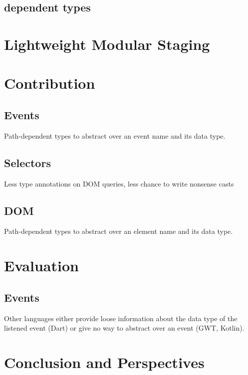 \documentclass[runningheads,a4paper]{llncs}
\begin{document}
\subsection{dependent types}

\section{Lightweight Modular Staging}

\section{Contribution}

\subsection{Events}

Path-dependent types to abstract over an event name and its data type.

\subsection{Selectors}

Less type annotations on DOM queries, less chance to write nonsense casts

\subsection{DOM}

Path-dependent types to abstract over an element name and its data type.

\section{Evaluation}

\subsection{Events}

Other languages either provide loose information about the data type of the listened event (Dart) or give no way to
abstract over an event (GWT, Kotlin).

\section{Conclusion and Perspectives}




\end{document}
